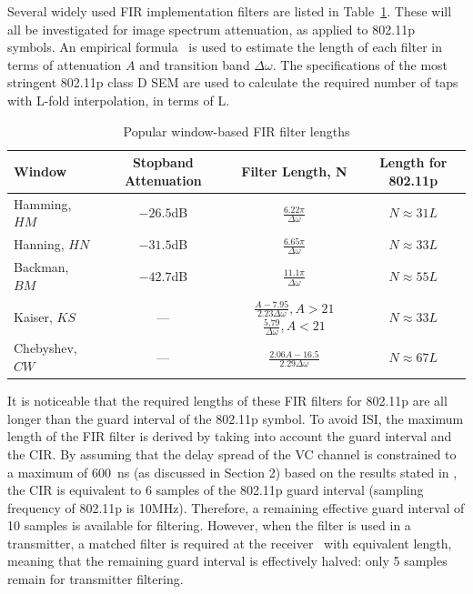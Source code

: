 Several widely used FIR implementation filters are listed in Table~\ref{tab:lengthFIR}. These will all be investigated for image spectrum attenuation, as applied to 802.11p symbols.
An empirical formula~\cite{Kapadia2012} is used to estimate the length of each filter in terms of attenuation $A$ and transition band $\Delta\omega$.
The specifications of the most stringent 802.11p class D SEM are used to calculate the required number of taps with L-fold interpolation, in terms of L.

\begin{table}[h]
	\centering
	\caption{Popular window-based FIR filter lengths}
	\label{tab:lengthFIR}
	\renewcommand{\arraystretch}{1.6}
	\begin{tabular}{l|c|c|c}
       \toprule
    		  Window 	& Stopband Attenuation  & Filter Length, N   & Length for 802.11p\\
    	\midrule
		Hamming, 	$HM$		& $-26.5$dB	& $\frac{6.22\pi}{\Delta\omega}$							&  $N \approx 31 L$ \\
		Hanning, $HN$				& $-31.5$dB	& $\frac{6.65\pi}{\Delta\omega}$							&  $N \approx 33 L$ \\
		Backman, $BM$			& $-42.7$dB	& $\frac{11.1\pi}{\Delta\omega}$							&  $N \approx 55 L$ \\
		Kaiser, $KS$				& --- 		&\parbox{3cm}{	$\frac{A-7.95}{2.23 \Delta\omega}, A>21$ \\
												$\frac{5.79}{\Delta\omega}, A<21$}			& $N \approx 33 L$ \\ [1ex]
		Chebyshev, $CW$		      & ---		& $\frac{2.06A -16.5}{2.29 \Delta\omega}$					& $N \approx 67 L$ \\
    	\bottomrule
    \end{tabular}
\end{table}

It is noticeable that the required lengths of these FIR filters for 802.11p are all longer than the guard interval of the 802.11p symbol.
To avoid ISI, the maximum length of the FIR filter is derived by taking into account the guard interval and the CIR.
By assuming that the delay spread of the VC channel is constrained to a maximum of 600~ns (as discussed in Section 2) based on the results stated in \cite{Acosta-Marum2007,Sen2008}, the CIR is equivalent to 6 samples of the 802.11p guard interval (sampling frequency of 802.11p is 10MHz).
Therefore, a remaining effective guard interval of 10 samples is available for filtering.
However, when the filter is used in a transmitter, a matched filter is required at the receiver~\cite{farhang2008signal} with equivalent length, meaning that the remaining guard interval is effectively halved: only 5 samples remain for transmitter filtering.

